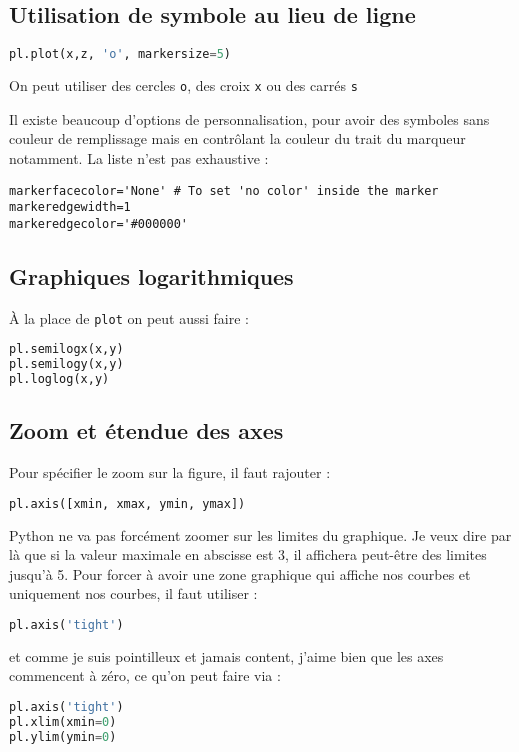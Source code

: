 \documentclass[a4paper,twoside]{article}
\begin{document}
\subsection{Utilisation de symbole au lieu de ligne}
\begin{lstlisting}[language=python]
pl.plot(x,z, 'o', markersize=5)
\end{lstlisting}
On peut utiliser des cercles \texttt{o}, des croix \texttt{x} ou des carrés \texttt{s}

Il existe beaucoup d'options de personnalisation, pour avoir des symboles sans couleur de remplissage mais en contrôlant la couleur du trait du marqueur notamment. La liste n'est pas exhaustive : 
\begin{verbatim}
markerfacecolor='None' # To set 'no color' inside the marker
markeredgewidth=1
markeredgecolor='#000000'
\end{verbatim}

\subsection{Graphiques logarithmiques}

À la place de \verb|plot| on peut aussi faire :
\begin{lstlisting}[language=python]
pl.semilogx(x,y)
pl.semilogy(x,y)
pl.loglog(x,y)
\end{lstlisting}

\subsection{Zoom et étendue des axes}

Pour spécifier le zoom sur la figure, il faut rajouter :
\begin{lstlisting}[language=python]
pl.axis([xmin, xmax, ymin, ymax])
\end{lstlisting}

Python ne va pas forcément zoomer sur les limites du graphique. Je veux dire par là que si la valeur maximale en abscisse est 3, il affichera peut-être des limites jusqu'à 5. Pour forcer à avoir une zone graphique qui affiche nos courbes et uniquement nos courbes, il faut utiliser :
\begin{lstlisting}[language=python]
pl.axis('tight')
\end{lstlisting}

et comme je suis pointilleux et jamais content, j'aime bien que les axes commencent à zéro, ce qu'on peut faire via :
\begin{lstlisting}[language=python]
pl.axis('tight')
pl.xlim(xmin=0)
pl.ylim(ymin=0)
\end{lstlisting}
\end{document}
